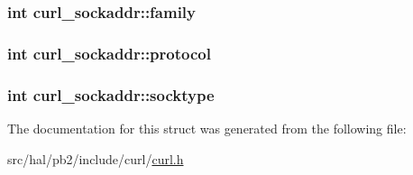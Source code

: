 \subsubsection[{\texorpdfstring{family}{family}}]{\setlength{\rightskip}{0pt plus 5cm}int curl\+\_\+sockaddr\+::family}\hypertarget{structcurl__sockaddr_ad5406982faaa070b7c928686ed31fdae}{}\label{structcurl__sockaddr_ad5406982faaa070b7c928686ed31fdae}
\subsubsection[{\texorpdfstring{protocol}{protocol}}]{\setlength{\rightskip}{0pt plus 5cm}int curl\+\_\+sockaddr\+::protocol}\hypertarget{structcurl__sockaddr_ab59abd90c680d1f37217c3f65ea58a02}{}\label{structcurl__sockaddr_ab59abd90c680d1f37217c3f65ea58a02}
\subsubsection[{\texorpdfstring{socktype}{socktype}}]{\setlength{\rightskip}{0pt plus 5cm}int curl\+\_\+sockaddr\+::socktype}\hypertarget{structcurl__sockaddr_a2c6c2c2083f3436c8b46c7d658be9aca}{}\label{structcurl__sockaddr_a2c6c2c2083f3436c8b46c7d658be9aca}


The documentation for this struct was generated from the following file\+:\begin{DoxyCompactItemize}
\item 
src/hal/pb2/include/curl/\hyperlink{curl_8h}{curl.\+h}\end{DoxyCompactItemize}
